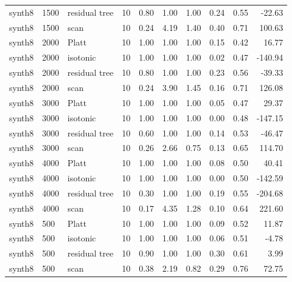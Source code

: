 \begin{tabular}{lllrrrrrrr}
synth8 & 1500 & residual tree & 10 & 0.80 & 1.00 & 1.00 & 0.24 & 0.55 & -22.63 \\
synth8 & 1500 & scan & 10 & 0.24 & 4.19 & 1.40 & 0.40 & 0.71 & 100.63 \\
synth8 & 2000 & Platt & 10 & 1.00 & 1.00 & 1.00 & 0.15 & 0.42 & 16.77 \\
synth8 & 2000 & isotonic & 10 & 1.00 & 1.00 & 1.00 & 0.02 & 0.47 & -140.94 \\
synth8 & 2000 & residual tree & 10 & 0.80 & 1.00 & 1.00 & 0.23 & 0.56 & -39.33 \\
synth8 & 2000 & scan & 10 & 0.24 & 3.90 & 1.45 & 0.16 & 0.71 & 126.08 \\
synth8 & 3000 & Platt & 10 & 1.00 & 1.00 & 1.00 & 0.05 & 0.47 & 29.37 \\
synth8 & 3000 & isotonic & 10 & 1.00 & 1.00 & 1.00 & 0.00 & 0.48 & -147.15 \\
synth8 & 3000 & residual tree & 10 & 0.60 & 1.00 & 1.00 & 0.14 & 0.53 & -46.47 \\
synth8 & 3000 & scan & 10 & 0.26 & 2.66 & 0.75 & 0.13 & 0.65 & 114.70 \\
synth8 & 4000 & Platt & 10 & 1.00 & 1.00 & 1.00 & 0.08 & 0.50 & 40.41 \\
synth8 & 4000 & isotonic & 10 & 1.00 & 1.00 & 1.00 & 0.00 & 0.50 & -142.59 \\
synth8 & 4000 & residual tree & 10 & 0.30 & 1.00 & 1.00 & 0.19 & 0.55 & -204.68 \\
synth8 & 4000 & scan & 10 & 0.17 & 4.35 & 1.28 & 0.10 & 0.64 & 221.60 \\
synth8 & 500 & Platt & 10 & 1.00 & 1.00 & 1.00 & 0.09 & 0.52 & 11.87 \\
synth8 & 500 & isotonic & 10 & 1.00 & 1.00 & 1.00 & 0.06 & 0.51 & -4.78 \\
synth8 & 500 & residual tree & 10 & 0.90 & 1.00 & 1.00 & 0.30 & 0.61 & 3.99 \\
synth8 & 500 & scan & 10 & 0.38 & 2.19 & 0.82 & 0.29 & 0.76 & 72.75 \\
\bottomrule
\end{tabular}
